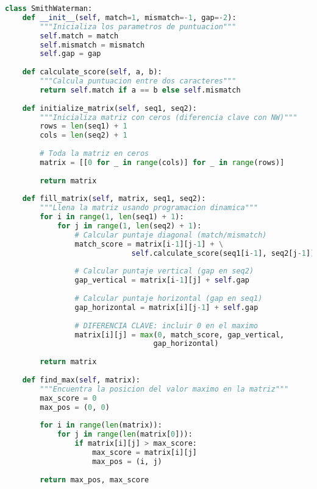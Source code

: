 \documentclass[12pt,a4paper]{article}
\begin{document}
\begin{lstlisting}[language=Python, caption=Clase SmithWaterman en Python]
class SmithWaterman:
    def __init__(self, match=1, mismatch=-1, gap=-2):
        """Inicializa los parametros de puntuacion"""
        self.match = match
        self.mismatch = mismatch
        self.gap = gap
    
    def calculate_score(self, a, b):
        """Calcula puntuacion entre dos caracteres"""
        return self.match if a == b else self.mismatch
    
    def initialize_matrix(self, seq1, seq2):
        """Inicializa matriz con ceros (diferencia clave con NW)"""
        rows = len(seq1) + 1
        cols = len(seq2) + 1
        
        # Toda la matriz en ceros
        matrix = [[0 for _ in range(cols)] for _ in range(rows)]
        
        return matrix
    
    def fill_matrix(self, matrix, seq1, seq2):
        """Llena la matriz usando programacion dinamica"""
        for i in range(1, len(seq1) + 1):
            for j in range(1, len(seq2) + 1):
                # Calcular puntaje diagonal (match/mismatch)
                match_score = matrix[i-1][j-1] + \
                             self.calculate_score(seq1[i-1], seq2[j-1])
                
                # Calcular puntaje vertical (gap en seq2)
                gap_vertical = matrix[i-1][j] + self.gap
                
                # Calcular puntaje horizontal (gap en seq1)
                gap_horizontal = matrix[i][j-1] + self.gap
                
                # DIFERENCIA CLAVE: incluir 0 en el maximo
                matrix[i][j] = max(0, match_score, gap_vertical, 
                                  gap_horizontal)
        
        return matrix
    
    def find_max(self, matrix):
        """Encuentra la posicion del valor maximo en la matriz"""
        max_score = 0
        max_pos = (0, 0)
        
        for i in range(len(matrix)):
            for j in range(len(matrix[0])):
                if matrix[i][j] > max_score:
                    max_score = matrix[i][j]
                    max_pos = (i, j)
        
        return max_pos, max_score
    

\end{lstlisting}
\end{document}
